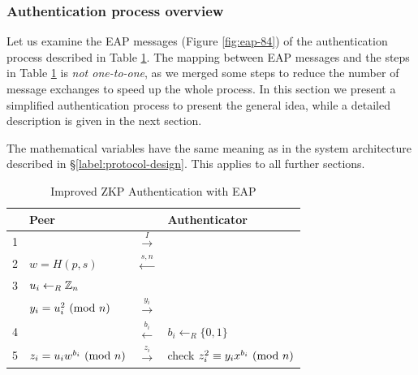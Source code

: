\subsubsection{Authentication process overview}
Let us examine the EAP messages (Figure \ref{fig:eap-84}) of the authentication process described in Table \ref{table:zkp-qrp-2}.
The mapping between EAP messages and the steps in Table \ref{table:zkp-qrp-2} is \textit{not one-to-one}, as we merged some steps to reduce the number of message exchanges to speed up the whole process.
In this section we present a simplified authentication process to present the general idea, while a detailed description is given in the next section.

The mathematical variables have the same meaning as in the system architecture described in \S\ref{label:protocol-design}. This applies to all further sections.
\begin{table}[h!]
	\centering
	\begin{tabular}{l|l|c|l}
  		& Peer & & Authenticator\\
  		\hline
  		1 & & $\xrightarrow{I}$ &\\
		2 & $w = H(p, s)$ & $\xleftarrow{s,n}$ & \\
		\hline
		3 & $u_i \leftarrow_R \Bbb{Z}_{n}$ &  \\
		& $y_i = u_i^2 \ (\mathrm{mod}\ n)$ & $\xrightarrow{y_i}$ \\
		4 & & $\xleftarrow{b_i}$ & $b_i \leftarrow_R \{0, 1\} $ \\
		5 & $z_i = u_iw^{b_i} \ (\mathrm{mod}\ n) $ & $\xrightarrow{z_i}$ & check $z_i^2 \equiv y_ix^{b_i} \ (\mathrm{mod}\ n)$\\
	\end{tabular}
	\caption{Improved ZKP Authentication with EAP}
	\label{table:zkp-qrp-2}
\end{table}

